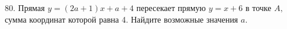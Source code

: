 80. Прямая $y=(2a+1)x+a+4$ пересекает прямую $y=x+6$ в точке $A,$ сумма координат которой равна 4. Найдите возможные значения $a.$\\
